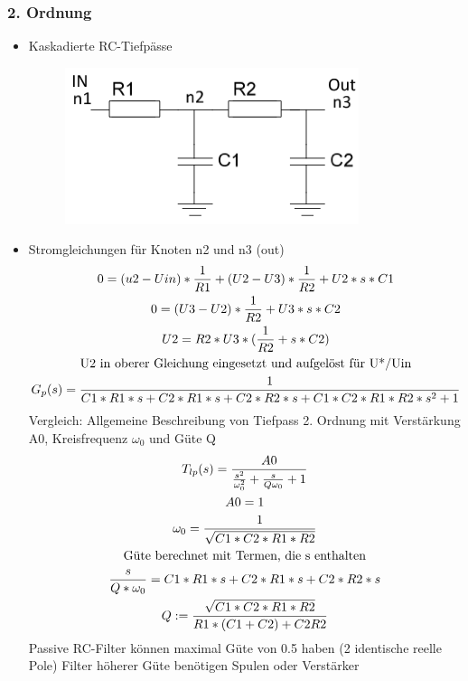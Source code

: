 \subsubsection{2. Ordnung}
\begin{itemize}
  \item Kaskadierte RC-Tiefpässe\\
  \begin{figure}[htb]
  \includegraphics[scale=0.4]{pictures/tiefpass2ordnung}
  \end{figure}
  \item Stromgleichungen für Knoten n2 und n3 (out)
  \begin{gather}
  0=(u2-Uin)*\frac{1}{R1}+(U2-U3)*\frac{1}{R2}+U2*s*C1\\
  0=(U3-U2)*\frac{1}{R2}+U3*s*C2\\
  U2=R2*U3*(\frac{1}{R2}+s*C2)\\
  \text{U2 in oberer Gleichung eingesetzt und aufgelöst für U*/Uin}\notag\\
  G_{p}(s)=\frac{1}{C1*R1*s+C2*R1*s+C2*R2*s+C1*C2*R1*R2*s^2+1}
  \end{gather}
  Vergleich: Allgemeine Beschreibung von Tiefpass 2. Ordnung mit
  Verstärkung A0, Kreisfrequenz $\omega_{0}$ und Güte Q
  \begin{gather}
  T_{lp}(s)=\frac{A0}{\frac{s^2}{\omega_{0}^2}+\frac{s}{Q\omega_{0}}+1}\\
  A0=1\notag\\
  \omega_{0}=\frac{1}{\sqrt{C1*C2*R1*R2}}\\
  \text{Güte berechnet mit Termen, die s enthalten}\notag\\
  \frac{s}{Q*\omega_{0}}=C1*R1*s+C2*R1*s+C2*R2*s\\
  Q:=\frac{\sqrt{C1*C2*R1*R2}}{R1*(C1+C2)+C2R2}
  \end{gather}
  Passive RC-Filter können maximal Güte von 0.5 haben (2 identische reelle
  Pole) Filter höherer Güte benötigen Spulen oder Verstärker
\end{itemize}
\newpage
